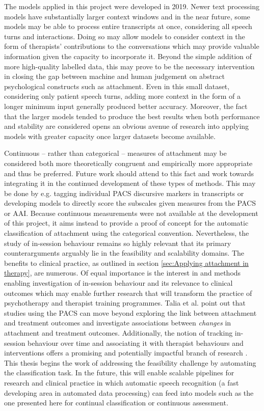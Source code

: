 \documentclass[12pt]{report}
\begin{document}
The models applied in this project were developed in 2019.
Newer text processing models have substantially larger context windows and in the near future, some models may be able to process entire transcripts at once, considering all speech turns and interactions.
Doing so may allow models to consider context in the form of therapists' contributions to the conversations which may provide valuable information given the capacity to incorporate it.
Beyond the simple addition of more high-quality labelled data, this may prove to be the necessary intervention in closing the gap between machine and human judgement on abstract psychological constructs such as attachment.
Even in this small dataset, considering only patient speech turns, adding more context in the form of a longer minimum input generally produced better accuracy.
Moreover, the fact that the larger models tended to produce the best results when both performance and stability are considered opens an obvious avenue of research into applying models with greater capacity once larger datasets become available.

Continuous -- rather than categorical -- measures of attachment may be considered both more theoretically congruent and empirically more appropriate and thus be preferred.
Future work should attend to this fact and work towards integrating it in the continued development of these types of methods.
This may be done by e.g. tagging individual PACS discursive markers in transcripts or developing models to directly score the subscales given measures from the PACS or AAI.
Because continuous measurements were not available at the development of this project, it aims instead to provide a proof of concept for the automatic classification of attachment using the categorical convention.
Nevertheless, the study of in-session behaviour remains so highly relevant that its primary counterarguments arguably lie in the feasibility and scalability domains.
The benefits to clinical practice, as outlined in section \ref{sec:Applying attachment in therapy}, are numerous.
Of equal importance is the interest in and methods enabling investigation of in-session behaviour and its relevance to clinical outcomes which may enable further research that will transform the practice of psychotherapy and therapist training programmes.
Talia et al. \citeyear{Talia2017} point out that studies using the PACS can move beyond exploring the link between attachment and treatment outcomes and investigate associations between \textit{changes} in attachment and treatment outcomes.
Additionally, the notion of tracking in-session behaviour over time and associating it with therapist behaviours and interventions offers a promising and potentially impactful branch of research \cite{Slade2016, Talia2017}.
This thesis begins the work of addressing the feasibility challenge by automating the classification task.
In the future, this will enable scalable pipelines for research and clinical practice in which automatic speech recognition (a fast developing area in automated data processing) can feed into models such as the one presented here for continual classification or continuous assessment.
\end{document}
